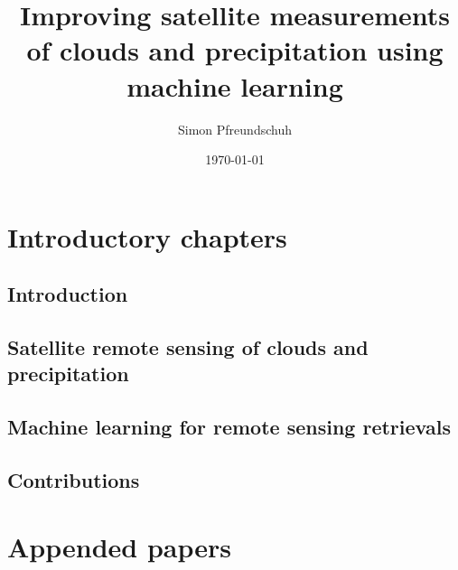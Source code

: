 \documentclass[12pt, a4paper, twoside]{report}
\title{Improving satellite measurements of clouds and precipitation using \mbox{machine} learning}
\author{Simon Pfreundschuh}
\date{\today}
\begin{document}





\tableofcontents
\clearpage



\part{Introductory chapters}

\chapter{Introduction}


\chapter{Satellite remote sensing of clouds and precipitation}


\chapter{Machine learning for remote sensing retrievals}


\chapter{Contributions}



 

\part{Appended papers}

\renewcommand{\chaptername}{Paper}
\setcounter{chapter}{0}
\end{document}
